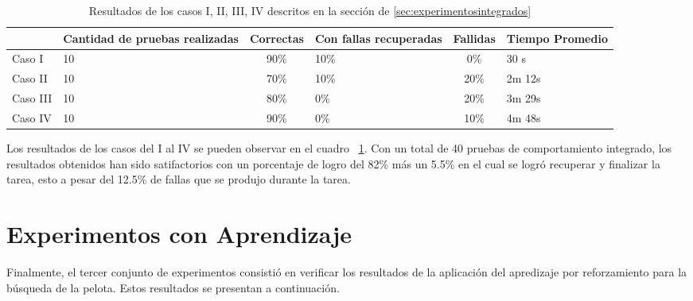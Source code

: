 \begin{table}
\centering

\begin{tabular}{|p{3cm}|p{2cm}|c|p{2cm}|c|p{2cm}|}
\hline 
& Cantidad de 
pruebas realizadas & Correctas & Con fallas recuperadas & Fallidas & Tiempo Promedio \\ 
\hline 
Caso I & 10 & 90\% & 10\% & 0\% & 30 s \\ 
\hline 
Caso II & 10 & 70\% & 10\% & 20\% & 2m 12s \\ 
\hline 
Caso III & 10 & 80\% & 0\% & 20\% & 3m 29s \\ 
\hline 
Caso IV & 10 & 90\% & 0\% & 10\% & 4m 48s \\ 
\hline 
\end{tabular} 

\caption{Resultados de los casos I, II, III, IV descritos en la secci\'on de \ref{sec:experimentosintegrados}}
\label{fig:casos}

\end{table}

Los resultados de los casos del I al IV se pueden observar en el cuadro ~\ref{fig:casos}. Con un total de 40 pruebas de comportamiento integrado, los resultados obtenidos han sido satifactorios con un porcentaje de logro del 82\% más un 5.5\% en el cual se logró recuperar y finalizar la tarea, esto a pesar del 12.5\% de fallas que se produjo durante la tarea. %



\section{Experimentos con Aprendizaje}\label{sec:experimentosAprend}

Finalmente, el tercer conjunto de experimentos consistió en verificar los resultados de la aplicaci\'on del apredizaje por reforzamiento para la búsqueda de la pelota. Estos resultados se presentan a continuaci\'on.

